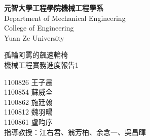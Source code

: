 \documentclass[12pt]{article}       %
\begin{document}
\begin{titlepage}
    \centering
    \vspace*{1cm} %

    {\LARGE \textbf{元智大學工程學院機械工程學系}} \\[0.5cm] %
    {\LARGE {Department of Mechanical Engineering}} \\[0.5cm] %
    {\LARGE {College of Engineering}} \\[0.5cm]
    {\LARGE {Yuan Ze University}}

    \vfill %

    {\LARGE{孤輪阿罵的飆速輪椅}} \\[0.5cm]%
    {\LARGE{機械工程實務進度報告1}} %

    \vfill %

    {\LARGE {1100826 王子晨}}\\[0.5cm]
    {\LARGE {1100854 蘇威全}}\\[0.5cm]
    {\LARGE {1100862 施廷翰}}\\[0.5cm]
    {\LARGE {1100812 魏羽暘}}\\[0.5cm]
    {\LARGE {1100861 盧昀序}}\\[2.5cm]
    {\LARGE {指導教授：江右君、翁芳柏、余念一、吳昌暉}}\\[0.5cm]

\end{titlepage}
\newpage

\setcounter{page}{1}  %





\end{document}
